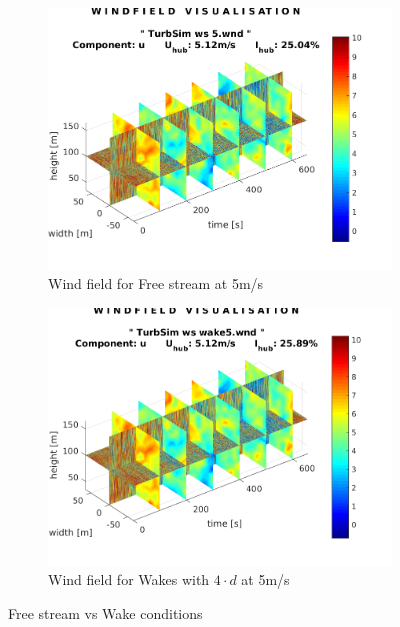 \documentclass[10pt]{article}
\begin{document}
\begin{figure}[htb!]
\begin{subfigure}{0.5\textwidth}
  \centering
  \includegraphics[width=1\linewidth]{../CIP_5/CIP_Tutorial_5_-_Windfield_and_wake_simulation/TurbSim/wind_5ms.png}
  \caption{Wind field for Free stream at 5m/s}
\end{subfigure}
\begin{subfigure}{0.5\textwidth}
  \centering
  \includegraphics[width=1\linewidth]{../CIP_5/CIP_Tutorial_5_-_Windfield_and_wake_simulation/TurbSim/wind_wake_4_5ms.png}
   \caption{Wind field for Wakes with $4\cdot d$ at 5m/s}
\end{subfigure}
\caption{Free stream vs Wake conditions}
\label{fig:windfieldsComp}
\end{figure}
\end{document}
